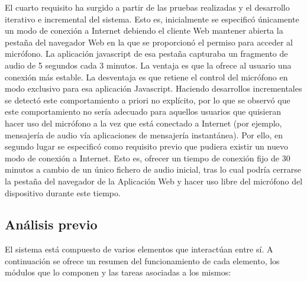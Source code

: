 El cuarto requisito ha surgido a partir de las pruebas realizadas y el desarrollo iterativo e incremental del sistema. Esto es, inicialmente se especificó únicamente un modo de conexión a Internet debiendo el cliente Web mantener abierta la pestaña del navegador Web en la que se proporcionó el permiso para acceder al micrófono. La aplicación javascript de esa pestaña capturaba un fragmento de audio de 5 segundos cada 3 minutos. La ventaja es que la ofrece al usuario una conexión más estable. La desventaja es que retiene el control del micrófono en modo exclusivo para esa aplicación Javascript. Haciendo desarrollos incrementales se detectó este comportamiento a priori no explícito, por lo que se observó que este comportamiento no sería adecuado para aquellos usuarios que quisieran hacer uso del micrófono a la vez que está conectado a Internet (por ejemplo, mensajería de audio vía aplicaciones de mensajería instantánea). Por ello, en segundo lugar se especificó como requisito previo que pudiera existir un nuevo modo de conexión a Internet. Esto es, ofrecer un tiempo de conexión fijo de 30 minutos a cambio de un único fichero de audio inicial, tras lo cual podría cerrarse la pestaña del navegador de la Aplicación Web y hacer uso libre del micrófono del dispositivo durante este tiempo.

\subsection{Análisis previo}

El sistema está compuesto de varios elementos que interactúan entre sí. A continuación se ofrece un resumen del funcionamiento de cada elemento, los módulos que lo componen y las tareas asociadas a los mismos:

